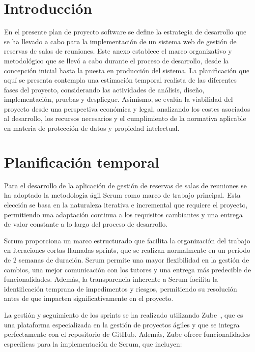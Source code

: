 
\section{Introducción}
En el presente plan de proyecto software se define la estrategia de desarrollo que se ha llevado a cabo para la implementación de un sistema web de gestión de reservas de salas de reuniones. Este anexo establece el marco organizativo y metodológico que se llevó a cabo durante el proceso de desarrollo, desde la concepción inicial hasta la puesta en producción del sistema. La planificación que aquí se presenta contempla una estimación temporal realista de las diferentes fases del proyecto, considerando las actividades de análisis, diseño, implementación, pruebas y despliegue. Asimismo, se evalúa la viabilidad del proyecto desde una perspectiva económica y legal, analizando los costes asociados al desarrollo, los recursos necesarios y el cumplimiento de la normativa aplicable en materia de protección de datos y propiedad intelectual.

\section{Planificación temporal}
Para el desarrollo de la aplicación de gestión de reservas de salas de reuniones se ha adoptado la metodología ágil Scrum como marco de trabajo principal. Esta elección se basa en la naturaleza iterativa e incremental que requiere el proyecto, permitiendo una adaptación continua a los requisitos cambiantes y una entrega de valor constante a lo largo del proceso de desarrollo.

Scrum proporciona un marco estructurado que facilita la organización del trabajo en iteraciones cortas llamadas sprints, que se realizan normalmente en un periodo de 2 semanas de duración. Scrum permite una mayor flexibilidad en la gestión de cambios, una mejor comunicación con los tutores y una entrega más predecible de funcionalidades. Además, la transparencia inherente a Scrum facilita la identificación temprana de impedimentos y riesgos, permitiendo su resolución antes de que impacten significativamente en el proyecto.

La gestión y seguimiento de los sprints se ha realizado utilizando Zube~\cite{zube}, que es una plataforma especializada en la gestión de proyectos ágiles y que se integra perfectamente con el repositorio de GitHub. Además, Zube ofrece funcionalidades específicas para la implementación de Scrum, que incluyen:

